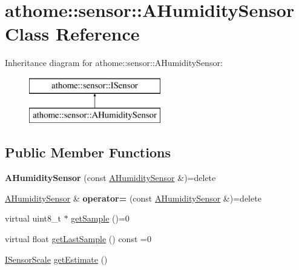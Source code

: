 \hypertarget{classathome_1_1sensor_1_1_a_humidity_sensor}{}\section{athome\+:\+:sensor\+:\+:A\+Humidity\+Sensor Class Reference}
\label{classathome_1_1sensor_1_1_a_humidity_sensor}
Inheritance diagram for athome\+:\+:sensor\+:\+:A\+Humidity\+Sensor\+:\begin{figure}[H]
\begin{center}
\leavevmode
\includegraphics[height=2.000000cm]{classathome_1_1sensor_1_1_a_humidity_sensor}
\end{center}
\end{figure}
\subsection*{Public Member Functions}
\begin{DoxyCompactItemize}
\item 
\mbox{\label{classathome_1_1sensor_1_1_a_humidity_sensor_aec2205040170bbf3c64fb1baf797795f}} 
{\bfseries A\+Humidity\+Sensor} (const \mbox{\hyperlink{classathome_1_1sensor_1_1_a_humidity_sensor}{A\+Humidity\+Sensor}} \&)=delete
\item 
\mbox{\label{classathome_1_1sensor_1_1_a_humidity_sensor_a530ebce44ecb090d32ab5450776f3c07}} 
\mbox{\hyperlink{classathome_1_1sensor_1_1_a_humidity_sensor}{A\+Humidity\+Sensor}} \& {\bfseries operator=} (const \mbox{\hyperlink{classathome_1_1sensor_1_1_a_humidity_sensor}{A\+Humidity\+Sensor}} \&)=delete
\item 
virtual uint8\+\_\+t $\ast$ \mbox{\hyperlink{classathome_1_1sensor_1_1_a_humidity_sensor_a2eb6de3ce2a4aeae0d9e556389d2b329}{get\+Sample}} ()=0
\item 
virtual float \mbox{\hyperlink{classathome_1_1sensor_1_1_a_humidity_sensor_a35c3e521f1ded20e8c3ba104524c57a0}{get\+Last\+Sample}} () const =0
\item 
\mbox{\hyperlink{classathome_1_1sensor_1_1_i_sensor_aa70bc27a4c17c86caf96cca776541ddf}{I\+Sensor\+Scale}} \mbox{\hyperlink{classathome_1_1sensor_1_1_a_humidity_sensor_a1da82433989c79066ce32d5606f4f675}{get\+Estimate}} ()
\end{DoxyCompactItemize}
